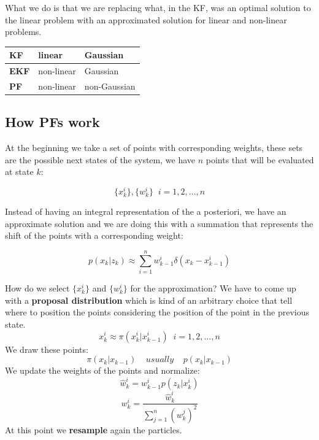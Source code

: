 What we do is that we are replacing what, in the KF, was an optimal solution to the linear problem with an approximated solution for linear and non-linear problems.

\begin{table}[H]
    \begin{tabular}{|l|l|l|}
    \hline
    \textbf{KF}  & linear     & Gaussian     \\ \hline
    \textbf{EKF} & non-linear & Gaussian     \\ \hline
    \textbf{PF}  & non-linear & non-Gaussian \\ \hline
    \end{tabular}
\end{table}

\subsection{How PFs work}

At the beginning we take a set of points with corresponding weights, these sets are the possible next states of the system, we have $n$ points that will be evaluated at state $k$:

\[
    \{x^i_{k}\},\{ w^i_{k}\}\;\;i=1,2,\dots,n
\]

Instead of having an integral representation of the a posteriori, we have an approximate solution and we are doing this with a summation that represents the shift of the points with a corresponding weight:

\[
    p(x_k|z_k) \approx \sum_{i=1}^{n} w^i_{k-1}\delta(x_k-x^i_{k-1})  
\]

How do we select \(\{x^i_{k}\}\) and \(\{ w^i_{k}\}\) for the approximation? We have to come up with a \textbf{proposal distribution} which is kind of an arbitrary choice that tell where to position the points considering the position of the point in the previous state.
\[
    x^i_k \approx \pi(x^i_k|x^i_{k-1})\;\;i=1,2,\dots,n
\]
We draw these points:
\[
    \pi(x_k|x_{k-1})\;\;\;\; usually \;\;\;\; p(x_k|x_{k-1})
\]
We update the weights of the points and normalize:
\[
    \hat{w}^i_k = w^i_{k-1}p(z_k|x^i_k)    
\]
\[
    w^i_k = \frac{\hat{w}^i_k}{\sum_{j=1}^{n}(w^j_k)^2}    
\]
At this point we \textbf{resample} again the particles.

